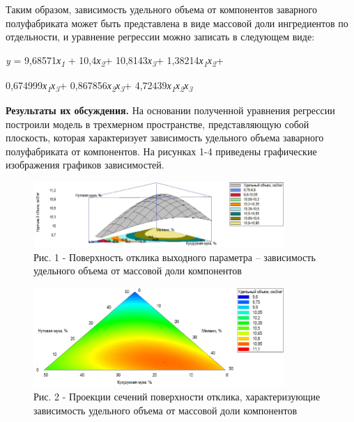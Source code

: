 \begin{multicols}{2}
Таким образом, зависимость удельного объема от компонентов заварного
полуфабриката может быть представлена в виде массовой доли ингредиентов
по отдельности, и уравнение регрессии можно записать в следующем виде:

\emph{y} = 9,68571\emph{х\textsubscript{1 }}+
10,4\emph{х\textsubscript{2}}+ 10,8143\emph{х\textsubscript{3}}+
1,38214\emph{х\textsubscript{1}х\textsubscript{2}}+

0,674999\emph{х\textsubscript{1}х\textsubscript{3}}+
0,867856\emph{х\textsubscript{2}х\textsubscript{3}}+
4,72439\emph{х\textsubscript{1}х\textsubscript{2}х\textsubscript{3}}

{\bfseries Результаты их обсуждения.} На основании полученной уравнения
регрессии построили модель в трехмерном пространстве, представляющую
собой плоскость, которая характеризует зависимость удельного объема
заварного полуфабриката от компонентов. На рисунках 1-4 приведены
графические изображения графиков зависимостей.
\end{multicols}

\begin{figure}[H]
	\centering
	\includegraphics[width=0.85\textwidth]{media/pish/image1}
	\caption*{Рис. 1 - Поверхность отклика выходного параметра -- зависимость
удельного объема от массовой доли компонентов}
\end{figure}

\begin{figure}[H]
	\centering
	\includegraphics[width=0.85\textwidth]{media/pish/image2}
	\caption*{Рис. 2 - Проекции сечений поверхности отклика, характеризующие
зависимость удельного объема от массовой доли компонентов}
\end{figure}

